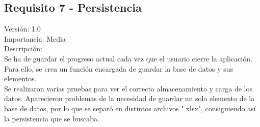 \subsection{Requisito 7 - Persistencia }
Versión: 1.0\\
Importancia: Media\\
Descripción:\\
Se ha de guardar el progreso actual cada vez que el usuario cierre la aplicación. Para ello, se crea un función encargada de guardar la base de datos y sus elementos.\\
Se realizaron varias pruebas para ver el correcto almacenamiento y carga de los datos. Aparecieron problemas de la necesidad de guardar un solo elemento de la base de datos, por lo que se separó en distintos archivos ".xlsx", consiguiendo así la persistencia que se buscaba.